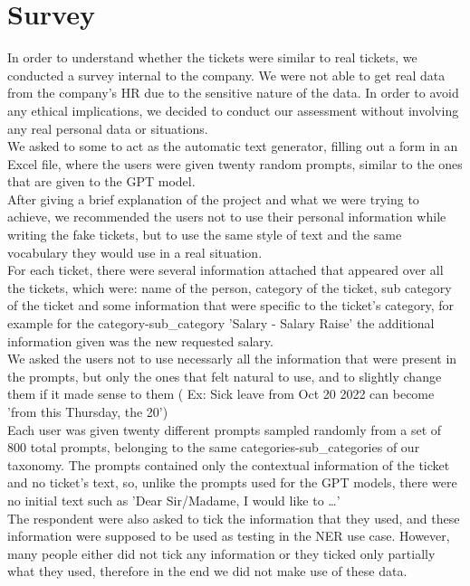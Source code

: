 \section{Survey}
\label{sec:survey}
In order to understand whether the tickets were similar to real tickets, we conducted a survey internal to the company. We were not able to get real data from the company's HR due to the sensitive nature of the data. In order to avoid any ethical implications, we decided to conduct our assessment without involving any real personal data or situations.  \\
We asked to some to act as the automatic text generator, filling out a form in an Excel file, where the users were given twenty random prompts, similar to the ones that are given to the GPT model. \\
After giving a brief explanation of the project and what we were trying to achieve, we recommended the users not to use their personal information while writing the fake tickets, but to use the same style of text and the same vocabulary they would use in a real situation. \\
For each ticket, there were several information attached that appeared over all the tickets, which were: name of the person, category of the ticket, sub category of the ticket and some information that were specific to the ticket's category, for example for the category-sub\_category 'Salary - Salary Raise' the additional information given was the new requested salary. \\
We asked the users not to use necessarly all the information that were present in the prompts, but only the ones that felt natural to use, and to slightly change them if it made sense to them ( Ex: Sick leave from Oct 20 2022 can become 'from this Thursday, the 20') \\
Each user was given twenty different prompts sampled randomly from a set of 800 total prompts, belonging to the same categories-sub\_categories of our taxonomy. The prompts contained only the contextual information of the ticket and no ticket's text, so, unlike the prompts used for the GPT models, there were no initial text such as 'Dear Sir/Madame, I would like to \dots' \\
The respondent were also asked to tick the information that they used, and these information were supposed to be used as testing in the NER use case. However, many people either did not tick any information or they ticked only partially what they used, therefore in the end we did not make use of these data. \\\\

